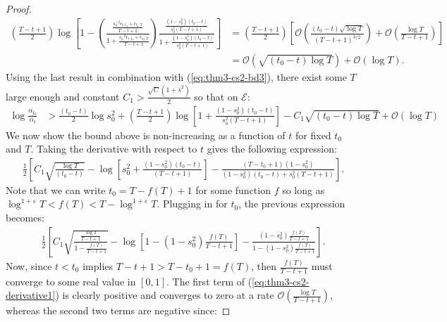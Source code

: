 \begin{proof}
\small
\begin{align*}
    \left(\frac{T - t +1}{2}\right)\log\left[1 - \left(\frac{\frac{s_0^{-2}\epsilon_{t:t_0} + \epsilon_{t_0:T}}{T-t+1}}{1 + \frac{s_0^{-2}\epsilon_{t:t_0} + \epsilon_{t_0:T}}{T-t+1}}\right)\frac{\frac{(1 - s_0^2)(t_0 - t)}{s_0^{2}(T-t+1)}}{1 + \frac{(1 - s_0^2)(t_0 - t)}{s_0^{2}(T-t+1)}}\right] &= \left(\frac{T - t +1}{2}\right)\left[\mathcal{O}\left(\frac{(t_0-t)\sqrt{\log T}}{(T-t+1)^{3/2}}\right)  + \mathcal{O}\left(\frac{\log T}{T-t+1}\right) \right] \\
    &= \mathcal{O}\left(\sqrt{(t_0-t)\log T}\right) + \mathcal{O}(\log T). \tag{$T-t+1 > t_0-t$}
\end{align*}
\normalsize
Using the last result in combination with (\ref{eq:thm3-cs2-bd3}), there exist some $T$ large enough and constant $C_1 > \frac{\sqrt{C}(1+\overline{s}^2)}{2}$ so that on $\mathcal{E}$: 
\begin{align}
    \log \frac{\alpha_{t_0}}{\alpha_t} &> \frac{(t_0-t)}{2}\log s_0^2 + \left(\frac{T - t +1}{2}\right)\log\left[1 + \frac{(1 - s_0^2)(t_0 - t)}{s_0^{2}(T-t+1)}\right] - C_1\sqrt{(t_0 -t)\log T} + \mathcal{O}(\log T) \label{eq:thm3-cs2-bd4}
\end{align}
We now show the bound above is non-increasing as a function of $t$ for fixed $t_0$ and $T$. Taking the derivative with respect to $t$ gives the following expression: 
\small
\begin{align*}
    \frac{1}{2}\left[C_1\sqrt{\frac{\log T}{(t_0 - t)}} - \log\left[s_0^2 + \frac{(1 - s_0^2)(t_0 - t)}{(T-t+1)}\right] - \frac{(T-t_0+1)(1-s_0^2)}{(1-s_0^2)(t_0-t) + s_0^2(T-t+1)}\right]. 
\end{align*}
\normalsize
Note that we can write $t_0 = T - f(T) + 1$ for some function $f$ so long as $\log^{1+\varepsilon} T < f(T) <T - \log^{1+\varepsilon} T$. Plugging in for $t_0$, the previous expression becomes:
\small
\begin{align}\label{eq:thm3-cs2-derivative1}
    \frac{1}{2}\left[C_1\sqrt{\frac{\frac{\log T}{T - t + 1}}{1 - \frac{f(T)}{T - t + 1}}} - \log\left[1 - (1 - s_0^2)\frac{f(T)}{T-t+1}\right] - \frac{(1 - s_0^2)\frac{f(T)}{T-t+1}}{1 - (1-s_0^2)\frac{f(T)}{T - t + 1}}\right]. 
\end{align}
\normalsize
Now, since $t < t_0$ implies $T-t+1 > T- t_0+1 = f(T)$, then $\frac{f(T)}{T-t+1}$ must converge to some real value in $[0,1]$. The first term of (\ref{eq:thm3-cs2-derivative1}) is clearly positive and converges to zero at a rate $\mathcal{O}\left(\frac{\log T}{T-t+1}\right)$, whereas the second two terms are negative since:

\end{proof}
